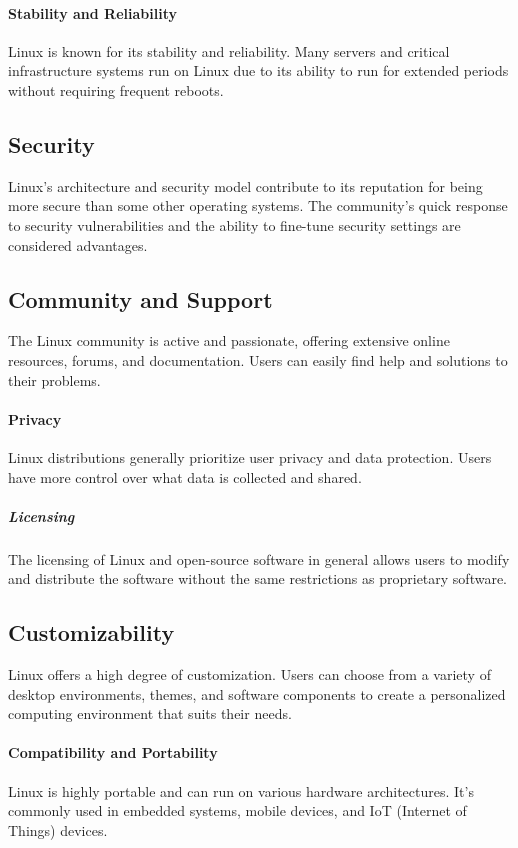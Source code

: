 \documentclass{article}
\begin{document}
\paragraph{Stability and  Reliability}
Linux is known for its stability and reliability. Many servers and critical infrastructure systems run on Linux due to its ability to run for extended periods without requiring frequent reboots.

\subsection{Security}
 Linux's architecture and security model contribute to its reputation for being more secure than some other operating systems. The community's quick response to security vulnerabilities and the ability to fine-tune security settings are considered advantages.


\subsection{Community and Support}
 The Linux community is active and passionate, offering extensive online resources, forums, and documentation. Users can easily find help and solutions to their problems.

\paragraph{Privacy}
Linux distributions generally prioritize user privacy and data protection. Users have more control over what data is collected and shared.

\subparagraph{Licensing}
The licensing of Linux and open-source software in general allows users to modify and distribute the software without the same restrictions as proprietary software.



\subsection{Customizability}
Linux offers a high degree of customization. Users can choose from a variety of desktop environments, themes, and software components to create a personalized computing environment that suits their needs.

\paragraph{Compatibility and Portability}
Linux is highly portable and can run on various hardware architectures. It's commonly used in embedded systems, mobile devices, and IoT (Internet of Things) devices.
\end{document}
